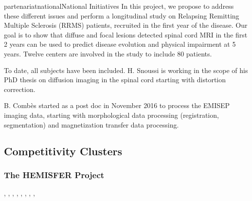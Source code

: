 \documentclass{ra2018}
\begin{document}
\begin{module}{partenariat}{national}{National Initiatives}
In this project, we propose to address these different issues and perform a
longitudinal study on Relapsing Remitting Multiple Sclerosis (RRMS) patients,
recruited in the first year of the disease. Our goal is to show that diffuse
and focal lesions detected spinal cord MRI in the first 2 years can be used to
predict disease evolution and physical impairment at 5 years. Twelve centers
are involved in the study to include 80 patients. 

To date, all subjects have been included. H. Snoussi is working in the
scope of his PhD thesis on diffusion imaging in the spinal cord starting with distortion correction. 

B. Combès started as a post doc in November 2016 to process the EMISEP imaging data, starting with morphological data processing (registration, segmentation) and magnetization transfer data processing. 

        \subsection{Competitivity Clusters}
        
        \subsubsection{The HEMISFER Project}
        \begin{participants}
          , 
          ,
          , 
          ,
          ,
          , 
          , 
          ,
        \end{participants}	
        

\end{module}
\end{document}
